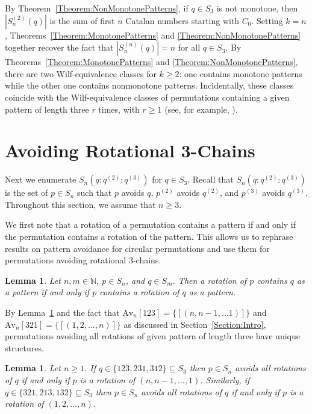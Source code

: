 \documentclass[11pt]{article}
\newtheorem{lemma}[theorem]{Lemma}
\theoremstyle{definition}
\numberwithin{equation}{section}
\begin{document}
By Theorem~\ref{Theorem:NonMonotonePatterns}, if $q\in S_3$ is not monotone, then $|S_n^{(2)}(q)|$ is the sum of first $n$ Catalan numbers starting with $C_0$. Setting $k=n$, Theorems~\ref{Theorem:MonotonePatterns} and \ref{Theorem:NonMonotonePatterns} together recover the fact that $|S_n^{(n)}(q)|=n$ for all $q\in S_3$. By Theorems~\ref{Theorem:MonotonePatterns} and \ref{Theorem:NonMonotonePatterns}, there are two Wilf-equivalence 
classes for $k\geq2$: one contains monotone patterns while the other one contains nonmonotone patterns. Incidentally, these classes coincide with the Wilf-equivalence classes of permutations containing a given pattern of length three $r$ times, with $r\geq 1$ (see, for example, \cite{CG2025}).


\section{Avoiding Rotational 3-Chains}\label{Section:Rot3Chain}
Next we enumerate $S_n(q:q^{(2)}:q^{(3)})$ for $q\in S_3$. Recall that $S_n(q:q^{(2)}:q^{(3)})$ is the set of $p\in S_n$ such that $p$ avoids $q$, $p^{(2)}$ avoids $q^{(2)}$, and $p^{(3)}$ avoids $q^{(3)}$. Throughout this section, we assume that $n\geq3$.

We first note that a rotation of a permutation contains a pattern if and only if the permutation contains a rotation of the pattern. This allows us to rephrase results on pattern avoidance for circular permutations and use them for permutations avoiding rotational 3-chains.

\begin{lemma}\label{Lemma:AvoidingAllRotations}
Let $n,m\in\mathbb{N}$, $p\in S_n$, and $q\in S_m$. Then a rotation of $p$ contains $q$ as a pattern if and only if $p$ contains a rotation of $q$ as a pattern.
\end{lemma}

By Lemma~\ref{Lemma:AvoidingAllRotations} and the fact that $
\text{Av}_n[123]=\{[(n,n-1,\ldots1)]\}$ and $
\text{Av}_n[321]=\{[(1,2,\ldots,n)]\}$ as discussed in Section~\ref{Section:Intro}, permutations avoiding all rotations of given pattern of length three have unique structures.

\begin{lemma}\label{Lemma:PermutationsAvRotations3}
Let $n\geq1$. If $q\in \{123,231,312\}\subseteq S_3$ then $p\in S_n$ avoids all rotations of $q$ if and only if $p$ is a rotation of $(n,n-1,\ldots,1)$. Similarly, if $q\in \{321,213,132\}\subseteq S_3$ then $p\in S_n$ avoids all rotations of $q$ if and only if $p$ is a rotation of $(1,2,\ldots, n)$.
\end{lemma}
\end{document}
